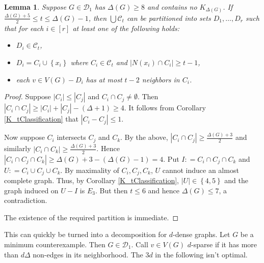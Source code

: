 \documentclass[12pt]{amsart}
\theoremstyle{plain}
\newtheorem{lem}[thm]{Lemma}
\theoremstyle{definition}
\theoremstyle{plain}
\newcommand{\fancy}[1]{\mathcal{#1}}
\newcommand{\CC}{\fancy{C}}
\newcommand{\D}{\fancy{D}}
\newcommand{\set}[1]{\left\{ #1 \right\}}
\newcommand{\card}[1]{\left|#1\right|}
\newcommand{\irange}[1]{\left[#1\right]}
\newcommand{\DefinedAs}{\mathrel{\mathop:}=}
\begin{document}
\begin{lem}\label{partition}
Suppose $G \in \D_1$ has $\Delta(G) \geq 8$ and contains no $K_{\Delta(G)}$. If
$\frac{\Delta(G) + 5}{2} \leq t \leq \Delta(G) - 1$, then $\bigcup \CC_t$ can be
partitioned into sets $D_1, \ldots, D_r$ such that for each $i \in \irange{r}$
at least one of the following holds:
\begin{itemize}
  \item $D_i \in \CC_t$,
  \item $D_i = C_i \cup \set{x_i}$ where $C_i \in \CC_t$ and $\card{N(x_i) \cap
  C_i} \geq t-1$,
  \item each $v \in V(G) - D_i$ has at most $t-2$ neighbors in $C_i$.
\end{itemize}
\end{lem}
\begin{proof}
Suppose $\card{C_i} \leq \card{C_j}$ and $C_i \cap C_j \neq \emptyset$. 
Then $\card{C_i \cap C_j} \geq \card{C_i} + \card{C_j} - (\Delta + 1) \geq 4$.  It follows from Corollary
\ref{K_tClassification} that $\card{C_i - C_j} \leq 1$.

Now suppose $C_i$ intersects $C_j$ and $C_k$.  By the above,
$\card{C_i \cap C_j} \geq \frac{\Delta(G) + 3}{2}$ and similarly $\card{C_i \cap
C_k} \geq \frac{\Delta(G) + 3}{2}$.  Hence $\card{C_i \cap C_j \cap C_k} \geq
\Delta(G) + 3 - (\Delta(G) - 1) = 4$.  Put $I \DefinedAs C_i \cap C_j \cap C_k$
and $U \DefinedAs C_i \cup C_j \cup C_k$.  By maximality of $C_i, C_j, C_k$,
$U$ cannot induce an almost complete graph.  Thus, by Corollary
\ref{K_tClassification}, $\card{U} \in \set{4, 5}$ and the graph induced on $U -
I$ is $E_3$.  But then $t \leq 6$ and hence $\Delta(G) \leq 7$, a contradiction.

\smallskip

\noindent The existence of the required partition is immediate. 
\end{proof}

This can quickly be turned into a decomposition for $d$-dense graphs.  Let $G$ be a minimum counterexample.  Then $G \in \D_1$.  Call $v \in V(G)$ $d$-sparse if it has more than $d\Delta$ non-edges in its neighborhood.  The $3d$ in the following isn't optimal.
\end{document}
